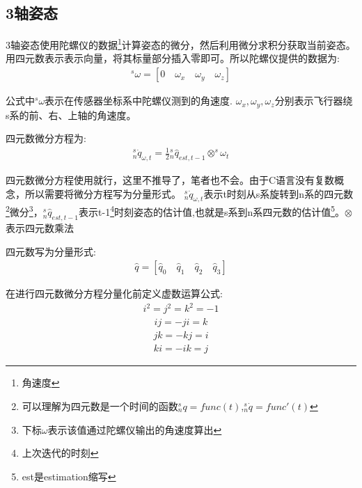 \documentclass[12pt,a4paper]{article}
\begin{document}
\subsection{3轴姿态}
3轴姿态使用陀螺仪的数据\footnote{角速度}计算姿态的微分，然后利用微分求积分获取当前姿态。用四元数表示表示向量，将其标量部分插入零即可。所以陀螺仪提供的数据为:
\begin{eqnarray}
    ^s\omega=[0\quad\omega_{x}\quad\omega_{y}\quad\omega_{z}] \label{陀螺仪数据}
\end{eqnarray}

公式中$^s\omega$表示在传感器坐标系中陀螺仪测到的角速度.
$\omega_{x},\omega_{y},\omega_{z}$分别表示飞行器绕s系的前、右、上轴的角速度。

四元数微分方程为:
\begin{eqnarray}
    ^s_n\dot{q}_{\omega,t}=\frac{1}{2}{^s_n\hat{q}_{est,t-1}}\otimes^s\omega_t \label{四元数微分方程}
\end{eqnarray}

四元数微分方程使用就行，这里不推导了，笔者也不会。由于C语言没有复数概念，所以需要将微分方程写为分量形式。
$^s_n\dot{q}_{\omega,t}$表示t时刻从s系旋转到n系的四元数\footnote{可以理解为四元数是一个时间的函数$^s_n{q}=func(t)$,$^s_n\dot{q}=func'(t)$}微分\footnote{下标$\omega$表示该值通过陀螺仪输出的角速度算出}，${^s_n\hat{q}_{est,t-1}}$表示t-1\footnote{上次迭代的时刻}时刻姿态的估计值,也就是s系到n系四元数的估计值\footnote{est是estimation缩写}。$\otimes$表示四元数乘法

四元数写为分量形式:
\begin{eqnarray}
    \hat{q}=[\hat{q}_0\quad \hat{q}_1\quad \hat{q}_2\quad \hat{q}_3] \label{分量四元数}
\end{eqnarray}

在进行四元数微分方程分量化前定义虚数运算公式:
\begin{eqnarray}
    i^2 = j^2 = k^2 = -1
\end{eqnarray}
\begin{eqnarray}
    ij = -ji = k
\end{eqnarray}
\begin{eqnarray}
    jk = -kj = i
\end{eqnarray}
\begin{eqnarray}
    ki = -ik = j
\end{eqnarray}
\end{document}

